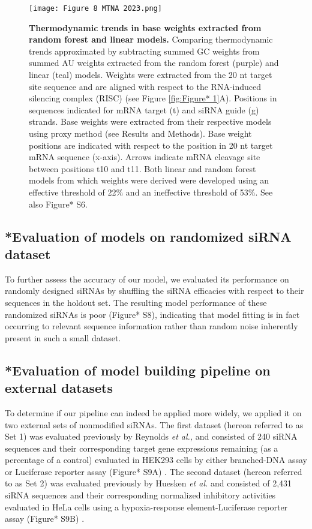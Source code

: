 \documentclass{report}
\begin{document}
\begin{figure}
    \centering
    \texttt{[image: Figure 8 MTNA 2023.png]}
    \caption{\textbf{Thermodynamic trends in base weights extracted from random forest and linear models. }Comparing thermodynamic trends approximated by subtracting summed GC weights from summed AU weights extracted from the random forest (purple) and linear (teal) models. Weights were extracted from the 20 nt target site sequence and are aligned with respect to the RNA-induced silencing complex (RISC) (see Figure \ref{fig:Figure* 1}A). Positions in sequences indicated for mRNA target (t) and siRNA guide (g) strands. Base weights were extracted from their respective models using proxy method (see Results and Methods). Base weight positions are indicated with respect to the position in 20 nt target mRNA sequence (x-axis). Arrows indicate mRNA cleavage site between positions t10 and t11. Both linear and random forest models from which weights were derived were developed using an effective threshold of 22\% and an ineffective threshold of 53\%. See also Figure* S6.
}
    \label{fig:Figure* 8}
\end{figure}

\subsection{*Evaluation of models on randomized siRNA dataset}
To further assess the accuracy of our model, we evaluated its performance on randomly designed siRNAs by shuffling the siRNA efficacies with respect to their sequences in the holdout set. The resulting model performance of these randomized siRNAs is poor (Figure* S8), indicating that model fitting is in fact occurring to relevant sequence information rather than random noise inherently present in such a small dataset.

\subsection{*Evaluation of model building pipeline on external datasets}
To determine if our pipeline can indeed be applied more widely, we applied it on two external sets of nonmodified siRNAs. The first dataset (hereon referred to as Set 1) was evaluated previously by Reynolds \textit{et al.,} and consisted of 240 siRNA sequences and their corresponding target gene expressions remaining (as a percentage of a control) evaluated in HEK293 cells by either branched-DNA assay or Luciferase reporter assay (Figure* S9A) \cite{reynolds_rational_2004}. The second dataset (hereon referred to as Set 2) was evaluated previously by Huesken \textit{et al.} and consisted of 2,431 siRNA sequences and their corresponding normalized inhibitory activities evaluated in HeLa cells using a hypoxia-response element-Luciferase reporter assay (Figure* S9B) \cite{huesken_design_2005}.
\end{document}
